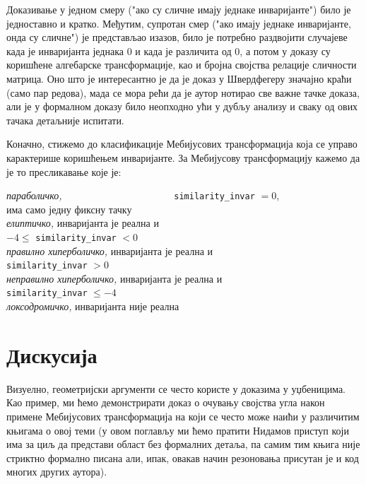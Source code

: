 \noindent Доказивање у једном смеру ("ако су сличне имају једнаке
инваријанте") било је једноставно и кратко. Међутим, супротан смер
("ако имају једнаке инваријанте, онда су сличне") је представљао
изазов, било је потребно раздвојити случајеве када је инваријанта
једнака $0$ и када је различита од $0$, а потом у доказу су коришћене
алгебарске трансформације, као и бројна својства релације сличности
матрица. Оно што је интересантно је да је доказ у Швердфегеру значајно
краћи (само пар редова), мада се мора рећи да је аутор нотирао све
важне тачке доказа, али је у формалном доказу било неопходно ући у
дубљу анализу и сваку од ових тачака детаљније испитати.

Коначно, стижемо до класификације Мебијусових трансформација која се
управо карактерише коришћењем инваријанте. За Мебијусову
трансформацију кажемо да је то пресликавање које је:
\begin{tabbing}
\emph{параболичко,}~~~~~~~~~~~~~~~~~~~~~~ \= {\tt similarity\_invar} $= 0$, \\
\> има само једну фиксну тачку \\
\emph{елиптичко,}  \> инваријанта је реална и \\
\> $-4 \le $ {\tt similarity\_invar} $< 0$ \\
\emph{правилно хиперболичко,}  \> инваријанта је реална и \\
\> {\tt similarity\_invar} $ > 0$ \\
\emph{неправилно хиперболичко,}  \> инваријанта је реална и \\
\> {\tt similarity\_invar} $\le -4$ \\
\emph{локсодромичко,} \> инваријанта није реална
\end{tabbing}

\section{Дискусија}
\label{sec:discuss}
Визуелно, геометријски аргументи се често користе у доказима у
уџбеницима. Као пример, ми ћемо демонстрирати доказ о очувању својства
угла након примене Мебијусових трансформација на који се често може
наићи у различитим књигама о овој теми (у овом поглављу ми ћемо
пратити Нидамов приступ \cite{needham} који има за циљ да представи
област без формалних детаља, па самим тим књига није стриктно формално
писана али, ипак, овакав начин резоновања присутан је и код многих
других аутора).

